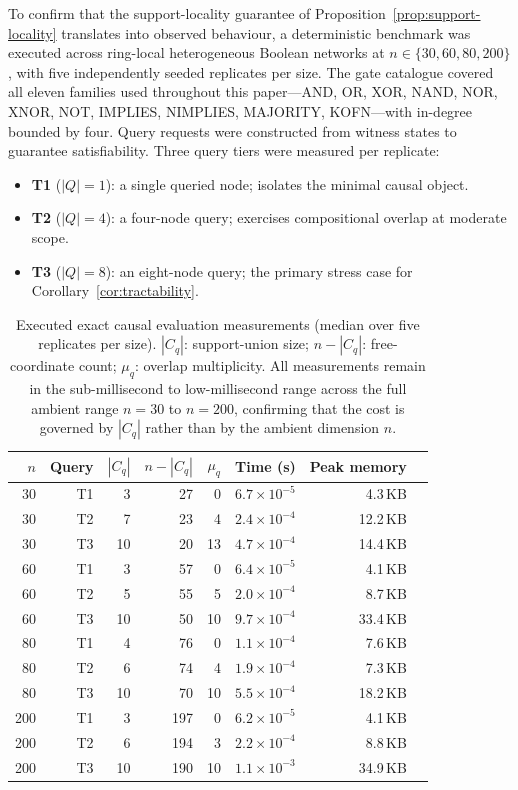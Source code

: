 \documentclass[11pt]{article}
\theoremstyle{definition}
\begin{document}
To confirm that the support-locality guarantee of Proposition~\ref{prop:support-locality}
translates into observed behaviour, a deterministic benchmark was executed across ring-local
heterogeneous Boolean networks at \(n\in\{30,60,80,200\}\), with five independently seeded
replicates per size. The gate catalogue covered all eleven families used throughout this paper---AND,
OR, XOR, NAND, NOR, XNOR, NOT, IMPLIES, NIMPLIES, MAJORITY, KOFN---with in-degree bounded by
four. Query requests were constructed from witness states to guarantee satisfiability. Three query
tiers were measured per replicate:
\begin{itemize}
\item \textbf{T1} (\(|Q|=1\)): a single queried node; isolates the minimal causal object.
\item \textbf{T2} (\(|Q|=4\)): a four-node query; exercises compositional overlap at moderate scope.
\item \textbf{T3} (\(|Q|=8\)): an eight-node query; the primary stress case for
  Corollary~\ref{cor:tractability}.
\end{itemize}

\begin{table}[h]
\centering
\small
\begin{tabular}{rrrrrrrl}
\toprule
\(n\) & Query & \(|C_q|\) & \(n-|C_q|\) & \(\mu_q\) & Time (s) & Peak memory \\
\midrule
 30 & T1 &  3 &  27 &  0 & \(6.7\times10^{-5}\) &  4.3\,KB \\
 30 & T2 &  7 &  23 &  4 & \(2.4\times10^{-4}\) & 12.2\,KB \\
 30 & T3 & 10 &  20 & 13 & \(4.7\times10^{-4}\) & 14.4\,KB \\
\midrule
 60 & T1 &  3 &  57 &  0 & \(6.4\times10^{-5}\) &  4.1\,KB \\
 60 & T2 &  5 &  55 &  5 & \(2.0\times10^{-4}\) &  8.7\,KB \\
 60 & T3 & 10 &  50 & 10 & \(9.7\times10^{-4}\) & 33.4\,KB \\
\midrule
 80 & T1 &  4 &  76 &  0 & \(1.1\times10^{-4}\) &  7.6\,KB \\
 80 & T2 &  6 &  74 &  4 & \(1.9\times10^{-4}\) &  7.3\,KB \\
 80 & T3 & 10 &  70 & 10 & \(5.5\times10^{-4}\) & 18.2\,KB \\
\midrule
200 & T1 &  3 & 197 &  0 & \(6.2\times10^{-5}\) &  4.1\,KB \\
200 & T2 &  6 & 194 &  3 & \(2.2\times10^{-4}\) &  8.8\,KB \\
200 & T3 & 10 & 190 & 10 & \(1.1\times10^{-3}\) & 34.9\,KB \\
\bottomrule
\end{tabular}
\caption{Executed exact causal evaluation measurements (median over five replicates per size).
\(|C_q|\): support-union size; \(n-|C_q|\): free-coordinate count;
\(\mu_q\): overlap multiplicity. All measurements remain in the sub-millisecond to
low-millisecond range across the full ambient range \(n=30\) to \(n=200\), confirming that
the cost is governed by \(|C_q|\) rather than by the ambient dimension \(n\).}
\label{tab:exact-method}
\end{table}
\end{document}
